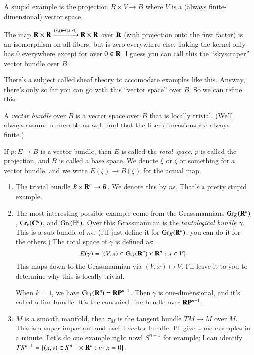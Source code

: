 A stupid example is the projection $B\times V\to B$ where $V$ is a (always finite-dimensional) vector space.
\begin{example}
    The map $\mathbf R\times\mathbf R\xrightarrow{(s,t)\mapsto(s,st)}\mathbf R\times\mathbf R$ over $\mathbf R$ (with projection onto the first factor) is an isomorphism on all fibers, but is zero everywhere else. Taking the kernel only has $0$ everywhere except for over $0\in\mathbf R$. I guess you can call this the ``skyscraper'' vector bundle over $B$.
\end{example}
There's a subject called sheaf theory to accomodate examples like this. Anyway, there's only so far you can go with this ``vector space'' over $B$. So we can refine this:
\begin{definition}
    A \emph{vector bundle} over $B$ is a vector space over $B$ that is locally trivial. (We'll always assume numerable as well, and that the fiber dimensions are always finite.)
\end{definition}
If $p:E\to B$ is a vector bundle, then $E$ is called the \emph{total space}, $p$ is called the projection, and $B$ is called a base space. We denote $\xi$ or $\zeta$ or something for a vector bundle, and we write $E(\xi)\to B(\xi)$ for the actual map.
\begin{example}
\begin{enumerate}
    \item The trivial bundle $B\times\mathbf R^n\to B$. We denote this by $n\epsilon$. That's a pretty stupid example.
    \item The most interesting possible example come from the Grassmannians $\mathrm{Gr}_K(\mathbf R^n)$, $\mathrm{Gr}_k(\mathbf C^n)$, and $\mathrm{Gr}_k(\mathbb H^n)$. Over this Grassmannian is the \emph{tautological bundle} $\gamma$. This is a sub-bundle of $n\epsilon$. (I'll just define it for $\mathrm{Gr}_K(\mathbf R^n)$, you can do it for the others.) The total space of $\gamma$ is defined as:
	\begin{equation*}
	    E(\gamma) = \{(V,x)\in\mathrm{Gr}_k(\mathbf R^n)\times\mathbf R^n:x\in V\}
	\end{equation*}
	This maps down to the Grassmannian via $(V,x)\mapsto V$. I'll leave it to you to determine why this is locally trivial.

	\begin{example}
	    When $k=1$, we have $\mathrm{Gr}_1(\mathbf R^n) = \mathbf{RP}^{n-1}$. Then $\gamma$ is one-dimensional, and it's called a line bundle. It's the canonical line bundle over $\mathbf{RP}^{n-1}$.
	\end{example}
    \item $M$ is a smooth manifold, then $\tau_M$ is the tangent bundle $TM\to M$ over $M$. This is a super important and useful vector bundle. I'll give some examples in a minute. Let's do one example right now! $S^{n-1}$ for example; I can identify $TS^{n-1} = \{(x,v)\in S^{n-1}\times\mathbf R^n:v\cdot x = 0\}$.
\end{enumerate}
\end{example}
